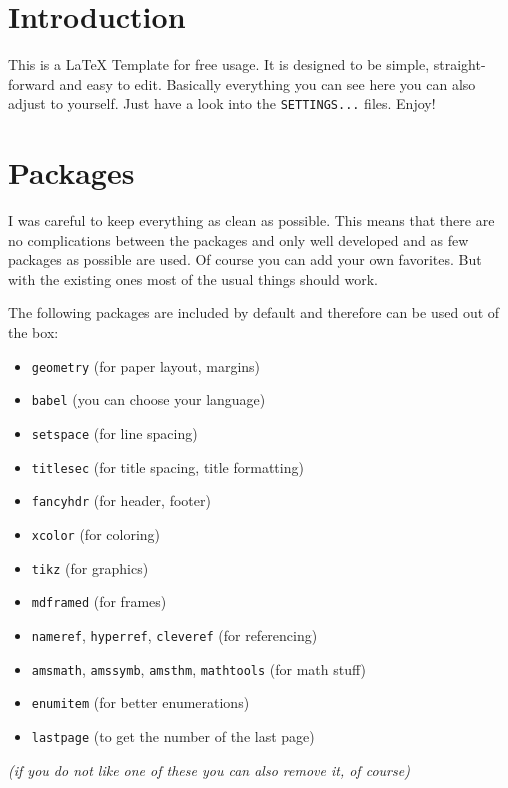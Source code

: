 \documentclass[11pt, a4paper]{article}
\begin{document}
\section{Introduction}

This is a \LaTeX{} Template for free usage. It is designed to be simple, straight-forward and easy to edit.
Basically everything you can see here you can also adjust to yourself. Just have a look into the \texttt{SETTINGS...} files. Enjoy!

\section{Packages}

I was careful to keep everything as clean as possible. This means that there are no complications between the packages and only well developed and as few packages as possible are used. Of course you can add your own favorites. But with the existing ones most of the usual things should work.

The following packages are included by default and therefore can be used out of the box:

\begin{itemize}[noitemsep]
	\item \texttt{geometry} (for paper layout, margins)
	\item \texttt{babel} (you can choose your language)
	\item \texttt{setspace} (for line spacing)
	\item \texttt{titlesec} (for title spacing, title formatting)
	\item \texttt{fancyhdr} (for header, footer)
	\item \texttt{xcolor} (for coloring)
	\item \texttt{tikz} (for graphics)
	\item \texttt{mdframed} (for frames)
	\item \texttt{nameref}, \texttt{hyperref}, \texttt{cleveref} (for referencing)
	\item \texttt{amsmath}, \texttt{amssymb}, \texttt{amsthm}, \texttt{mathtools} (for math stuff)
	\item \texttt{enumitem} (for better enumerations)
	\item \texttt{lastpage} (to get the number of the last page)
\end{itemize}

\textsl{(if you do not like one of these you can also remove it, of course)}
\end{document}
